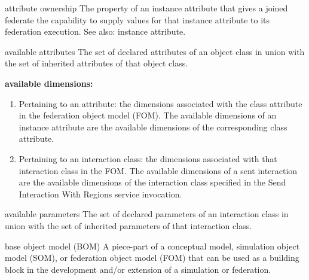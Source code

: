 
\newpage
\begin{definition}{attribute ownership}
    The property of an instance attribute that gives a joined federate the capability to supply values for that instance attribute to its federation execution. See also: instance attribute.
\end{definition}

\begin{definition}{available attributes}
    The set of declared attributes of an object class in union with the set of inherited attributes of that object class.
\end{definition}

\par\noindent\textbf{available dimensions:}\par

\begin{enumerate}[label=\alph*)]
\item Pertaining to an attribute: the dimensions associated with the class attribute in the federation object model (FOM). The available dimensions of an instance attribute are the available dimensions of the corresponding class attribute.
\item Pertaining to an interaction class: the dimensions associated with that interaction class in the FOM. The available dimensions of a sent interaction are the available dimensions of the interaction class specified in the Send Interaction With Regions service invocation.
\end{enumerate}


\begin{definition}{available parameters}
    The set of declared parameters of an interaction class in union with the set of inherited parameters of that interaction class.
\end{definition}

\begin{definition}{base object model (BOM)}
    A piece-part of a conceptual model, simulation object model (SOM), or federation object model (FOM) that can be used as a building block in the development and/or extension of a simulation or federation.
\end{definition}

